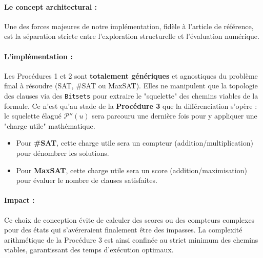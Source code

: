 \documentclass[11pt,a4paper]{report}
\begin{document}
\paragraph{Le concept architectural :}
Une des forces majeures de notre implémentation, fidèle à l'article de référence, est la séparation stricte entre l'exploration structurelle et l'évaluation numérique.

\paragraph{L'implémentation :}
Les Procédures 1 et 2 sont \textbf{totalement génériques} et agnostiques du problème final à résoudre (SAT, \#SAT ou MaxSAT). Elles ne manipulent que la topologie des clauses via des \texttt{Bitsets} pour extraire le "squelette" des chemins viables de la formule. 
Ce n'est qu'au stade de la \textbf{Procédure 3} que la différenciation s'opère : le squelette élagué $\mathcal{P}''(u)$ sera parcouru une dernière fois pour y appliquer une "charge utile" mathématique. 
\begin{itemize}
    \item Pour \textbf{\#SAT}, cette charge utile sera un compteur (addition/multiplication) pour dénombrer les solutions.
    \item Pour \textbf{MaxSAT}, cette charge utile sera un score (addition/maximisation) pour évaluer le nombre de clauses satisfaites.
\end{itemize}

\paragraph{Impact :}
Ce choix de conception évite de calculer des scores ou des compteurs complexes pour des états qui s'avéreraient finalement être des impasses. La complexité arithmétique de la Procédure 3 est ainsi confinée au strict minimum des chemins viables, garantissant des temps d'exécution optimaux.
\end{document}
